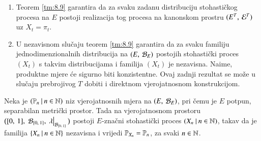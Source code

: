 \begin{nap} \label{nap:8.10}
    \begin{enumerate}[label=(\alph*)]
        \item Teorem \ref{tm:8.9} garantira da za svaku zadanu distribuciju stohasti\v ckog procesa na $E$ postoji realizacija tog procesa na kanonskom prostru $({E^T}, \: {\mathcal{E}^T})$ uz $X_t = \pi_t$.
        \item U nezavisnom slu\v caju teorem \ref{tm:8.9} garantira da za svaku familiju jednodimenzionalnih distribucija na $({E}, \: {\mathcal{B}_{E}})$ postojih stohasti\v cki proces $(X_t)$ s takvim distribucijama i familija $(X_t)$ je nezavisna.
        Naime, produktne mjere \' ce sigurno biti konzistentne.
        Ovaj zadnji rezultat se mo\v ze u slu\v caju prebrojivog $T$ dobiti i direktnom vjerojatnosnom konstrukcijom.
    \end{enumerate}
\end{nap}

\begin{tm}  \label{tm:8.11}
    Neka je $({\mathbb{P}_n} \: | \: {n \in \mathbb{N}})$ niz vjerojatnosnih mjera na $({E}, \: {\mathcal{B}_{E}})$, pri \v cemu je $E$ potpun, separabilan metri\v cki prostor.
    Tada na vjerojatnosnom prostoru $\big( \segment{0}{1}, \; \borel{\segment{0}{1}}, \; \restr{\lambda}{\borel{\segment{0}{1}}} \big)$ postoji $E$-zna\v cni stohasti\v cki proces $({X_n} \: | \: {n \in \mathbb{N}})$, takav da je familija $\{{X_n} \: | \: {n \in \mathbb{N}}\}$ nezavisna i vrijedi $\mathbb{P}_{X_n} = \mathbb{P}_n$, za svaki $n \in \mathbb{N}$.
\end{tm}

